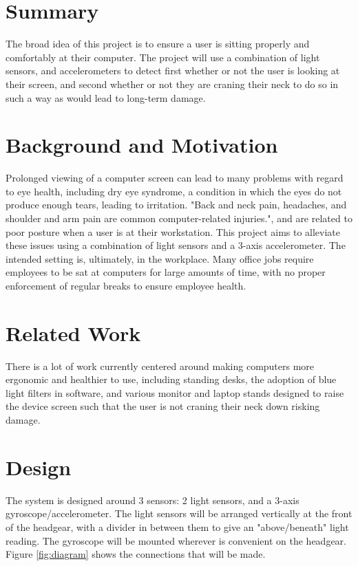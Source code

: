 \documentclass[12pt, a4paper]{report}
\begin{document}
\maketitle

\tableofcontents
\pagebreak

\section{Summary}
The broad idea of this project is to ensure a user is sitting properly and comfortably at their computer.
The project will use a combination of light sensors, and accelerometers to detect first whether or not the user is looking at their screen, and second whether or not they are craning their neck to do so in such a way as would lead to long-term damage.

\section{Background and Motivation}
Prolonged viewing of a computer screen can lead to many problems with regard to eye health, including dry eye syndrome\cite{dryeyes}, a condition in which the eyes do not produce enough tears, leading to irritation.
"Back and neck pain, headaches, and shoulder and arm pain are common computer-related injuries."\cite{vicgov}, and are related to poor posture when a user is at their workstation.
This project aims to alleviate these issues using a combination of light sensors and a 3-axis accelerometer.
The intended setting is, ultimately, in the workplace.
Many office jobs require employees to be sat at computers for large amounts of time, with no proper enforcement of regular breaks to ensure employee health.

\section{Related Work}
There is a lot of work currently centered around making computers more ergonomic and healthier to use, including standing desks, the adoption of blue light filters in software, and various monitor and laptop stands designed to raise the device screen such that the user is not craning their neck down risking damage.

\section{Design}

The system is designed around 3 sensors: 2 light sensors, and a 3-axis gyroscope/accelerometer.
The light sensors will be arranged vertically at the front of the headgear, with a divider in between them to give an "above/beneath" light reading.
The gyroscope will be mounted wherever is convenient on the headgear.
Figure \ref{fig:diagram} shows the connections that will be made.
\end{document}

